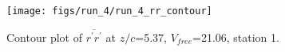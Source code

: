 \begin{figure}[H]
\centering
\texttt{[image: figs/run\_4/run\_4\_rr\_contour]}
\caption{Contour plot of $\overline{r^\prime r^\prime}$ at $z/c$=5.37, $V_{free}$=21.06, station 1.}
\label{fig:run_4_rr_contour}
\end{figure}



